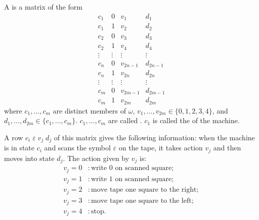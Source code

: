 A  is a matrix of the form
\[
\begin{array}{cccc}
c_1 & 0 & v_1 & d_1 \\
c_1 & 1 & v_2 & d_2 \\
c_2 & 0 & v_3 & d_3 \\
c_2 & 1 & v_4 & d_4 \\
\vdots & \vdots & \vdots & \vdots \\
c_n & 0 & v_{2n-1} & d_{2n-1} \\
c_n & 1 & v_{2n} & d_{2n} \\
\vdots & \vdots & \vdots & \vdots \\
c_m & 0 & v_{2m-1} & d_{2m-1} \\
c_m & 1 & v_{2m} & d_{2m}
\end{array}
\]
where $c_1, \ldots, c_m$ are distinct members of $\omega$, $v_1, \ldots, v_{2m} \in \{0, 1, 2, 3, 4\}$, and $d_1, \ldots, d_{2m} \in \{c_1, \ldots, c_m\}$. $c_1, \ldots, c_m$ are called . $c_1$ is called the  of the machine.

A row $c_i \; \varepsilon \; v_j \; d_j$ of this matrix gives the following information: when the machine is in state $c_i$ and scans the symbol $\varepsilon$ on the tape, it takes action $v_j$ and then moves into state $d_j$. The action given by $v_j$ is:
\begin{align*}
v_j = 0 &: \text{write } 0 \text{ on scanned square}; \\
v_j = 1 &: \text{write } 1 \text{ on scanned square}; \\
v_j = 2 &: \text{move tape one square to the right}; \\
v_j = 3 &: \text{move tape one square to the left}; \\
v_j = 4 &: \text{stop}.
\end{align*}
